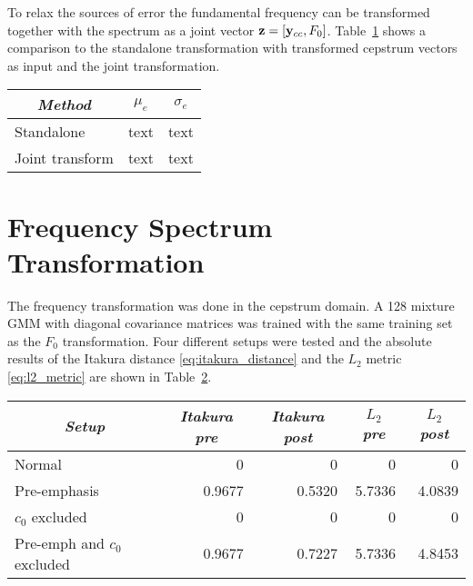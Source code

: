 To relax the sources of error the fundamental frequency can be transformed together with the spectrum as a joint vector $\mathbf{z} = \left[\mathbf{y}_{cc},F_0\right]$. Table~\ref{tab:f0_joint_transform} shows a comparison to the standalone transformation with transformed cepstrum vectors as input and the joint transformation.
\begin{table}[htbp]
	\begin{center}
		\label{tab:f0_joint_transform}
		\begin{tabular}{lll}
			\toprule
			\multicolumn{1}{c}{\emph{Method}} & \multicolumn{1}{c}{\emph{$\mu_e$}} & \multicolumn{1}{c}{\emph{$\sigma_e$}}\\
			\midrule
			Standalone & text & text \\
			Joint transform & text & text \\
			\bottomrule			
		\end{tabular}		
	\end{center}	
\end{table}

\section{Frequency Spectrum Transformation} %
\label{sec:frequency_transformation}
The frequency transformation was done in the cepstrum domain. A 128 mixture GMM with diagonal covariance matrices was trained with the same training set as the $F_0$ transformation. Four different setups were tested and the absolute results of the Itakura distance \eqref{eq:itakura_distance} and the $L_2$ metric \eqref{eq:l2_metric} are shown in Table~\ref{tab:absolute_results}.
\begin{table}[htbp]
	\begin{center}
		\label{tab:absolute_results}
		\begin{tabular}{lrrrr}
			\toprule
			\multicolumn{1}{c}{\emph{Setup}} & \multicolumn{1}{c}{\emph{Itakura pre}} & \multicolumn{1}{c}{\emph{Itakura post}} & \multicolumn{1}{c}{\emph{$L_2$ pre}} & \multicolumn{1}{c}{\emph{$L_2$ post}}\\
			\midrule
			Normal & 0 & 0 & 0 & 0 \\
			Pre-emphasis & 0.9677 & 0.5320 & 5.7336 & 4.0839 \\
			$c_0$ excluded & 0 & 0 & 0 & 0 \\
			Pre-emph and $c_0$ excluded & 0.9677 & 0.7227 & 5.7336 & 4.8453 \\
			\bottomrule			
		\end{tabular}		
	\end{center}	
\end{table}

